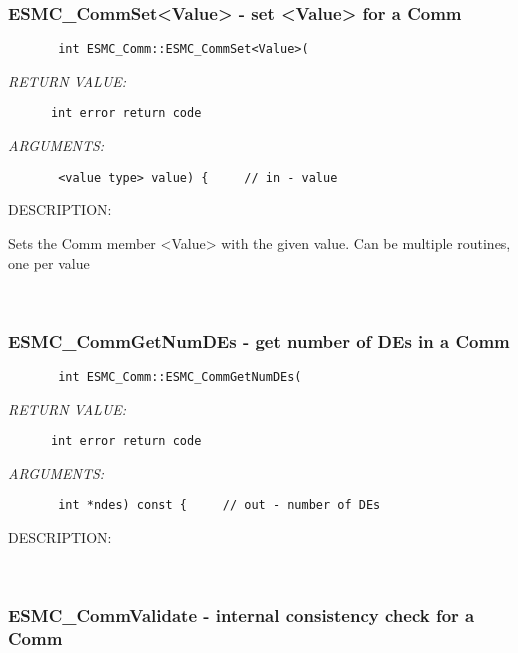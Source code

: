 \subsubsection{ESMC\_CommSet<Value> - set <Value> for a Comm}


  
\begin{verbatim}       int ESMC_Comm::ESMC_CommSet<Value>(\end{verbatim}{\em RETURN VALUE:}
\begin{verbatim}      int error return code\end{verbatim}{\em ARGUMENTS:}
\begin{verbatim}       <value type> value) {     // in - value\end{verbatim}
{\sf DESCRIPTION:\\ }


       Sets the Comm member <Value> with the given value.
       Can be multiple routines, one per value
   
 
\mbox{}\hrulefill\ 
 
\subsubsection{ESMC\_CommGetNumDEs - get number of DEs in a Comm}


  
\begin{verbatim}       int ESMC_Comm::ESMC_CommGetNumDEs(\end{verbatim}{\em RETURN VALUE:}
\begin{verbatim}      int error return code\end{verbatim}{\em ARGUMENTS:}
\begin{verbatim}       int *ndes) const {     // out - number of DEs\end{verbatim}
{\sf DESCRIPTION:\\ }


   
 
\mbox{}\hrulefill\ 
 
\subsubsection{ESMC\_CommValidate - internal consistency check for a Comm}


